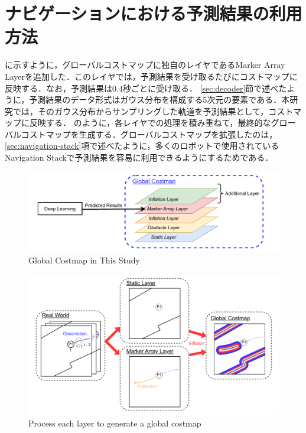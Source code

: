 \section{ナビゲーションにおける予測結果の利用方法}\label{sec:nav-usage}
に示すように，グローバルコストマップに独自のレイヤであるMarker Array Layerを追加した．このレイヤでは，予測結果を受け取るたびにコストマップに反映する．なお，予測結果は0.4秒ごとに受け取る．
\ref{sec:decoder}節で述べたように，予測結果のデータ形式はガウス分布を構成する5次元の要素である．本研究では，そのガウス分布からサンプリングした軌道を予測結果として，コストマップに反映する．
のように，各レイヤでの処理を積み重ねて，最終的なグローバルコストマップを生成する．グローバルコストマップを拡張したのは，\ref{sec:navigation-stack}項で述べたように，多くのロボットで使用されているNavigation Stackで予測結果を容易に利用できるようにするためである．

\begin{figure}[H]
  \centering
 \includegraphics[keepaspectratio, scale=0.7]
      {images/layer.pdf}
\caption{Global Costmap in This Study}
 \label{Fig:global-costmap}
\end{figure} 

\begin{figure}[H]
  \centering
 \includegraphics[keepaspectratio, scale=0.47]
      {images/costmap-image.pdf}
\caption{Process each layer to generate a global costmap}
 \label{Fig:costmap-flow}
\end{figure} 


\newpage
